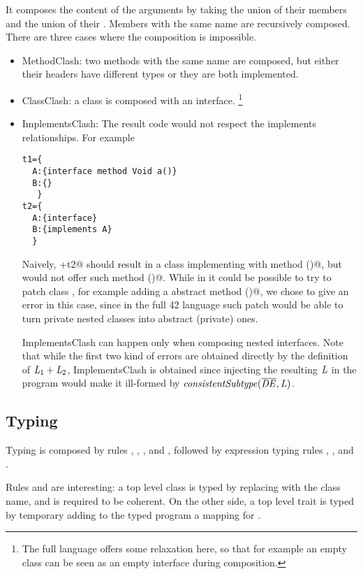 It composes the content of the arguments
by taking the union of their members and the union of their \Q@implements@.
Members with the same name are recursively composed.
There are three cases where the composition is impossible.
\begin{itemize}
\item MethodClash: two methods with the same name are composed,
but either their headers have different types or they are both implemented.
\item ClassClash: a class is composed with an interface.%
\footnote{
The full language offers some relaxation here, so that for example an empty class can be seen as an empty interface during composition.
}
\item ImplementsClash:
The result code would not respect the implements relationships.
For example
\begin{lstlisting}
t1={
  A:{interface method Void a()}
  B:{}
   }
t2={
  A:{interface}
  B:{implements A}
  }
\end{lstlisting}
Naively, +t2@ should result in a class \Q@B@ implementing \Q@A@ with method \Q@a()@,
but \Q@B@ would not offer such method \Q@a()@.
While in \name it could be possible to try to patch class \Q@B@, for example adding a
abstract method \Q@a()@, we chose to give an error in this case, since in the full 42 language
such patch would 
be able to turn private nested classes
into abstract (private) ones.

ImplementsClash can happen only when composing nested interfaces. Note that while the first two kind of errors are obtained directly by the definition of 
$\mathit{L}_1+\mathit{L}_2$, ImplementsClash is obtained since injecting the resulting 
$\mathit{L}$ in the program would make it ill-formed by 
$\mathit{consistentSubtype}(\overline{\mathit{DE}},\mathit{L})$.
\end{itemize}

\subsection{Typing}
Typing is composed by rules , ,
,
 and ,
followed by expression typing rules
, ,  and .

Rules  and 
are interesting: a top level class is typed by replacing \Q@This@ with the class name,
and is required to be coherent.
On the other side, a top level trait is typed by temporary adding to the typed program a mapping for
\Q@This@.

